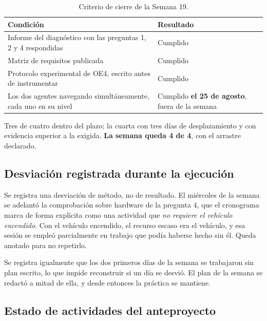 \documentclass[12pt,letterpaper]{article}
\begin{document}
\begin{table}[H]
    \centering
    \small
    \caption{Criterio de cierre de la Semana 19.}
    \label{tab:cierre}
    \begin{tabular}{@{}p{7.6cm}p{5.6cm}@{}}
        \toprule
        \textbf{Condición} & \textbf{Resultado} \\ \midrule
        Informe del diagnóstico con las preguntas 1, 2 y 4 respondidas & Cumplido \\ \addlinespace
        Matriz de requisitos publicada & Cumplido \\ \addlinespace
        Protocolo experimental de OE4, escrito antes de instrumentar & Cumplido \\ \addlinespace
        Los dos agentes navegando simultáneamente, cada uno en su nivel & Cumplido \textbf{el 25 de agosto}, fuera de la semana \\ \bottomrule
    \end{tabular}
\end{table}

Tres de cuatro dentro del plazo; la cuarta con tres días de desplazamiento y con evidencia superior a la exigida. \textbf{La semana queda 4 de 4}, con el arrastre declarado.

\subsection{Desviación registrada durante la ejecución}

Se registra una desviación de método, no de resultado. El miércoles de la semana se adelantó la comprobación sobre hardware de la pregunta 4, que el cronograma marca de forma explícita como una actividad que \emph{no requiere el vehículo encendido}. Con el vehículo encendido, el recurso escaso era el vehículo, y esa sesión se empleó parcialmente en trabajo que podía haberse hecho sin él. Queda anotado para no repetirlo.

Se registra igualmente que los dos primeros días de la semana se trabajaron sin plan escrito, lo que impide reconstruir si un día se desvió. El plan de la semana se redactó a mitad de ella, y desde entonces la práctica se mantiene.

\subsection{Estado de actividades del anteproyecto}
\end{document}
